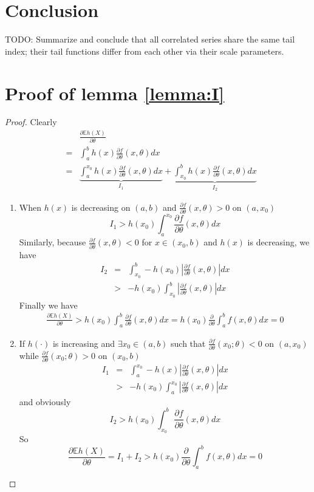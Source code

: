 \documentclass{article}
\newcommand{\pd}[2]{
  \frac{\partial #1}{\partial #2}
}
\newcommand{\opd}[1]{
  \frac{\partial}{\partial #1}
}
\newcommand{\E}{
  \mathbb{E}
}
\newcommand{\1}[1]{
  \mathbf{1}_{\{#1\}}
}
\begin{document}

\section{Conclusion}
TODO: Summarize and conclude that all correlated series share the same
tail index; their tail functions differ from each other via their
scale parameters.

\appendix
\section{Proof of lemma \ref{lemma:I}}
\begin{proof}
  Clearly
  \begin{eqnarray*}
    && \pd{\E h(X)}{\theta} \\
    &=& \int_a^b h(x) \pd{f}{\theta}(x, \theta) dx \\
    &=& \underbrace{\int_a^{x_0} h(x) \pd{f}{\theta}(x, \theta) dx}_{I_1}
    + \underbrace{\int_{x_0}^b h(x) \pd{f}{\theta}(x, \theta) dx}_{I_2}
  \end{eqnarray*}
  \begin{enumerate}
  \item When $h(x)$ is decreasing on $(a, b)$ and $\pd{f}{\theta}(x,
    \theta) > 0$ on $(a, x_0)$
    \[
    I_1 > h(x_0) \int_a^{x_0} \pd{f}{\theta}(x, \theta) dx
    \]
    Similarly, because $\pd{f}{\theta}(x, \theta) < 0$ for $x \in (x_0, b)$ and
    $h(x)$ is decreasing, we have
    \begin{eqnarray*}
      I_2 &=& \int_{x_0}^b -h(x_0)
      \left|\pd{f}{\theta}(x, \theta) \right| dx \\
      &>& -h(x_0)
      \int_{x_0}^b \left| 
        \pd{f}{\theta}(x, \theta)
      \right| dx
    \end{eqnarray*}
    Finally we have
    \begin{eqnarray*}
      \pd{\E h(X)}{\theta}
      > h(x_0) \int_a^b \pd{f}{\theta}(x, \theta) dx
      = h(x_0) \opd{\theta} \int_a^b f(x, \theta) dx
      = 0
    \end{eqnarray*}
  \item If $h(\cdot)$ is increasing and $\exists x_0 \in (a, b)$ such that 
    $\pd{f}{\theta}(x_0; \theta) < 0$ on $(a, x_0)$  while
    $\pd{f}{\theta}(x_0; \theta) > 0$ on $(x_0, b)$
    \begin{eqnarray*}
      I_1 &=&
      \int_a^{x_0} -h(x)
      \left| \pd{f}{\theta}(x, \theta) \right| dx \\
      &>&
      -h(x_0) \int_a^{x_0}
      \left| \pd{f}{\theta}(x, \theta) \right| dx
    \end{eqnarray*}
    and obviously
    \[
    I_2 > h(x_0) \int_{x_0}^b
    \pd{f}{\theta}(x, \theta) dx
    \]
    So
    \[
    \pd{\E h(X)}{\theta}
    = I_1 + I_2
    > h(x_0) \opd{\theta} \int_a^b f(x, \theta) dx = 0
    \]
  \end{enumerate}
\end{proof}
\end{document}
